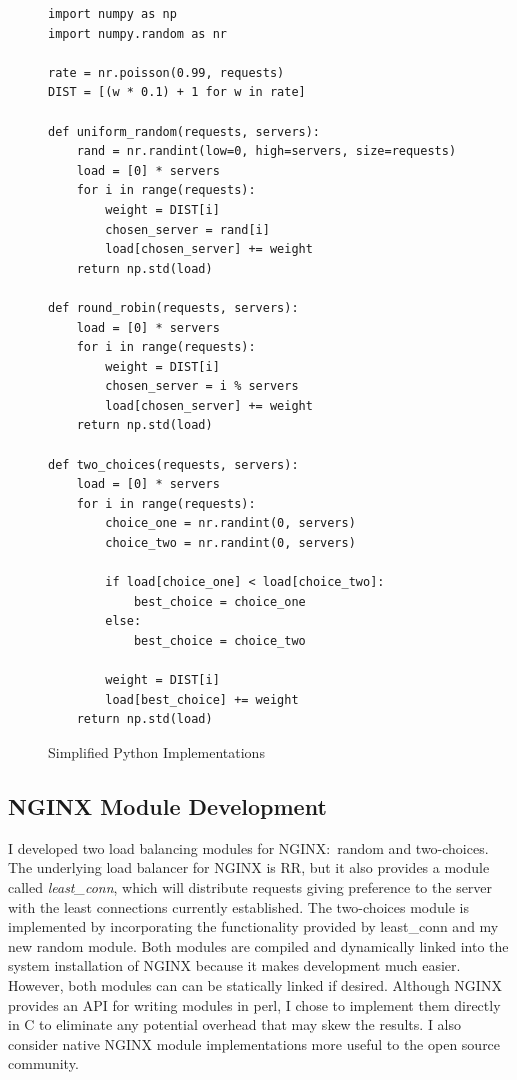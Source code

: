 \begin{figure}
\begin{verbatim}
import numpy as np
import numpy.random as nr

rate = nr.poisson(0.99, requests)
DIST = [(w * 0.1) + 1 for w in rate]

def uniform_random(requests, servers):
    rand = nr.randint(low=0, high=servers, size=requests)
    load = [0] * servers
    for i in range(requests):
        weight = DIST[i]
        chosen_server = rand[i]
        load[chosen_server] += weight
    return np.std(load)

def round_robin(requests, servers):
    load = [0] * servers
    for i in range(requests):
        weight = DIST[i]
        chosen_server = i % servers
        load[chosen_server] += weight
    return np.std(load)

def two_choices(requests, servers):
    load = [0] * servers
    for i in range(requests):
        choice_one = nr.randint(0, servers)
        choice_two = nr.randint(0, servers)
        
        if load[choice_one] < load[choice_two]:
            best_choice = choice_one
        else:
            best_choice = choice_two  

        weight = DIST[i]
        load[best_choice] += weight
    return np.std(load)
\end{verbatim}
\caption{Simplified Python Implementations}
\label{fig:notebook}
\end{figure}

\subsection{NGINX Module Development}
I developed two load balancing modules for NGINX:\ random and
two-choices. The underlying load balancer for NGINX is RR, but it also
provides a module called \emph{least_conn}, which will distribute
requests giving preference to the server with the least connections
currently established. The two-choices module is implemented by
incorporating the functionality provided by least_conn and my new
random module. Both modules are compiled and dynamically linked into
the system installation of NGINX because it makes development much
easier. However, both modules can can be statically linked if desired.
Although NGINX provides an API for writing modules in perl, I chose to
implement them directly in C to eliminate any potential overhead that
may skew the results. I also consider native NGINX module
implementations more useful to the open source community.

